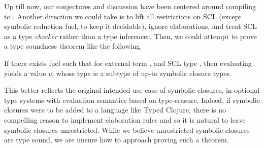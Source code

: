 
Up till now, our conjectures and discussion have been centered around compiling to \ltiFsub.
Another direction we could take is to lift all restrictions
on SCL (except symbolic reduction fuel, to keep it decidable),
ignore elaborations, and treat SCL as a type \emph{checker} rather than a
type inferencer.
Then, we could attempt to prove a type soundness theorem
like the following.

\begin{conjecture}
  If there exists fuel {\ltiFuel{}} such that
     \ltitSstkjudgementNoElab{\ltiFuel{}}
                       {\ltiEmptyEnv}
                       {\ltiE{}}
                       {\ltiT{}}
                       {\ltiFuelp{}}
                       {\ltiEp{}}
  for external term \ltiE{}, and
                       SCL type \ltiT{},
                      then
  evaluating {\ltiE{}}
                       yields a value $v$, whose type \ltiTp{}
                       is a subtype of
                       {\ltiT{}} up-to symbolic closure types.
\end{conjecture}

This better reflects the original intended use-case of symbolic closures,
in optional type systems with evaluation semantics based on type-erasure.
Indeed, if symbolic closures were to be added to a language like Typed Clojure,
there is no compelling reason to implement elaboration rules and so it is
natural to leave symbolic closures unrestricted. While we believe unrestricted
symbolic closures are type sound, we are unsure how to approach proving such
a theorem.

